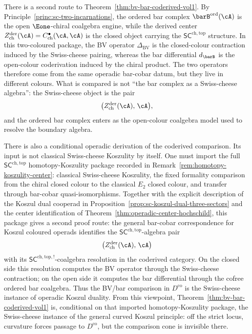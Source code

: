 \begin{remark}
\label{rem:bv-bar-coderived-operadic}%
%
%
There is a second route to
Theorem~\ref{thm:bv-bar-coderived-vol1}. By
Principle~\ref{princ:sc-two-incarnations}, the ordered bar complex
$\barB^{\mathrm{ord}}(\cA)$ is the open
$\Eone$-chiral coalgebra engine, while the derived center
$Z^{\mathrm{der}}_{\mathrm{ch}}(\cA)
= C^{\bullet}_{\mathrm{ch}}(\cA,\cA)$ is the closed object carrying
the $\mathsf{SC}^{\mathrm{ch,top}}$ structure. In this two-coloured
package, the BV operator $\Delta_{\mathrm{BV}}$ is the closed-colour
contraction induced by the Swiss-cheese pairing, whereas the bar
differential $d_{\barB}$ is the open-colour coderivation induced by
the chiral product. The two operators therefore come from the same
operadic bar-cobar datum, but they live in different colours. What is
compared is not ``the bar complex as a Swiss-cheese algebra'': the
Swiss-cheese object is the pair
\[
\bigl(Z^{\mathrm{der}}_{\mathrm{ch}}(\cA),\,\cA\bigr),
\]
and the ordered bar complex enters as the open-colour coalgebra model
used to resolve the boundary algebra.

There is also a conditional operadic derivation of the coderived
comparison. Its input is not classical Swiss-cheese Koszulity by
itself. One must import the full
$\mathsf{SC}^{\mathrm{ch,top}}$ homotopy-Koszulity package recorded in
Remark~\ref{rem:homotopy-koszulity-center}: classical Swiss-cheese
Koszulity, the fixed formality comparison from the chiral closed
colour to the classical $E_2$ closed colour, and transfer through
bar-cobar quasi-isomorphisms. Together with the explicit description
of the Koszul dual cooperad in
Proposition~\ref{prop:sc-koszul-dual-three-sectors} and the center
identification of Theorem~\ref{thm:operadic-center-hochschild}, this
package gives a second proof route: the general bar-cobar
correspondence for Koszul coloured operads identifies the
$\mathsf{SC}^{\mathrm{ch,top}}$-algebra pair
\[
\bigl(Z^{\mathrm{der}}_{\mathrm{ch}}(\cA),\,\cA\bigr)
\]
with its
$\mathsf{SC}^{\mathrm{ch,top},!}$-coalgebra resolution in the coderived
category. On the closed side this resolution computes the BV operator
through the Swiss-cheese contraction; on the open side it computes the
bar differential through the cofree ordered bar coalgebra. Thus the
BV/bar comparison in $D^{\mathrm{co}}$ is the Swiss-cheese instance of
operadic Koszul duality. From this viewpoint,
Theorem~\ref{thm:bv-bar-coderived-vol1} is, conditional on that
imported homotopy-Koszulity package, the Swiss-cheese instance of the
general curved Koszul principle: off the strict locus, curvature
forces passage to $D^{\mathrm{co}}$, but the comparison cone is
invisible there.


\end{remark}
